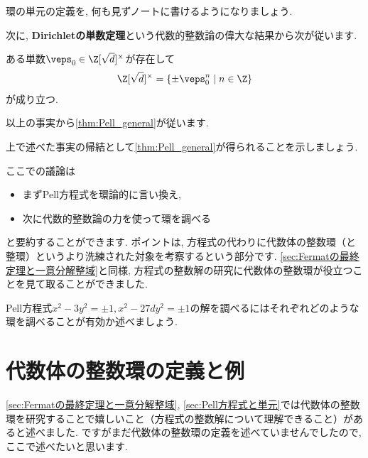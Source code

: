 \documentclass[11pt,b5paper,oneside,titlepage,lualatex]{ltjsreport}
\numberwithin{equation}{section} %
\begin{document}
\begin{exc}{}{}
	環の単元の定義を, 何も見ずノートに書けるようになりましょう. 
\end{exc}

次に, \textbf{Dirichletの単数定理}という代数的整数論の偉大な結果から次が従います. 

\begin{thm}{}{}
	ある単数$ \veps_0 \in \Z[\sqrt{d}]^\times $が存在して
	\[
	\Z[\sqrt{d}]^\times = \{ \pm \veps_0^n \mid n \in \Z \}
	\]
	が成り立つ. 
\end{thm}

以上の事実から\cref{thm:Pell_general}が従います. 

\begin{exc}{}{}
	上で述べた事実の帰結として\cref{thm:Pell_general}が得られることを示しましょう. 
\end{exc}

ここでの議論は
\begin{itemize}
	\item まずPell方程式を環論的に言い換え, 
	\item 次に代数的整数論の力を使って環を調べる
\end{itemize}
と要約することができます. 
ポイントは, 方程式の代わりに代数体の整数環（と整環）というより洗練された対象を考察するという部分です. 
\cref{sec:Fermatの最終定理と一意分解整域}と同様, 方程式の整数解の研究に代数体の整数環が役立つことを見て取ることができました. 

\begin{exc}{}{}
	Pell方程式$ x^2 - 3y^2 = \pm 1, x^2 - 27dy^2 = \pm 1 $の解を調べるにはそれぞれどのような環を調べることが有効か述べましょう. 
\end{exc}


\section{代数体の整数環の定義と例} \label{sec:代数体の整数環の定義と例}


\cref{sec:Fermatの最終定理と一意分解整域}, \cref{sec:Pell方程式と単元}では代数体の整数環を研究することで嬉しいこと（方程式の整数解について理解できること）があると述べました. 
ですがまだ代数体の整数環の定義を述べていませんでしたので, ここで述べたいと思います. 
\end{document}
